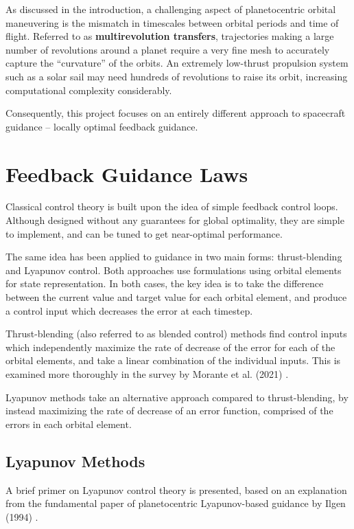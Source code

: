 As discussed in the introduction, a challenging aspect of planetocentric orbital maneuvering is the mismatch in timescales between orbital periods and time of flight. Referred to as \textbf{multirevolution transfers}, trajectories making a large number of revolutions around a planet require a very fine mesh to accurately capture the ``curvature'' of the orbits. An extremely low-thrust propulsion system such as a solar sail may need hundreds of revolutions to raise its orbit, increasing computational complexity considerably.

Consequently, this project focuses on an entirely different approach to spacecraft guidance -- locally optimal feedback guidance.

\section{Feedback Guidance Laws}
Classical control theory is built upon the idea of simple feedback control loops. Although designed without any guarantees for global optimality, they are simple to implement, and can be tuned to get near-optimal performance.

The same idea has been applied to guidance in two main forms: thrust-blending and Lyapunov control. Both approaches use formulations using orbital elements for state representation. In both cases, the key idea is to take the difference between the current value and target value for each orbital element, and produce a control input which decreases the error at each timestep. 

Thrust-blending (also referred to as blended control) methods find control inputs which independently maximize the rate of decrease of the error for each of the orbital elements, and take a linear combination of the individual inputs. This is examined more thoroughly in the survey by Morante et al. (2021) \cite{morante2021survey}.

Lyapunov methods take an alternative approach compared to thrust-blending, by instead maximizing the rate of decrease of an error function, comprised of the errors in each orbital element.

\subsection{Lyapunov Methods}
A brief primer on Lyapunov control theory is presented, based on an explanation from the fundamental paper of planetocentric Lyapunov-based guidance by Ilgen (1994) \cite{ilgen1994low}.

